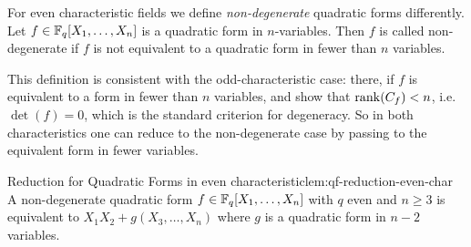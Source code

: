 For even characteristic fields we define \emph{non-degenerate} quadratic forms differently. Let $f\in\mathbb{F}_q[X_1,\dots,X_n]$ is a quadratic form in $n$-variables. Then $f$ is called non-degenerate if $f$ is not equivalent to a quadratic form in fewer than $n$ variables.
\begin{note}
  This definition is consistent with the odd-characteristic case: there, if $f$ is equivalent to a form in fewer than $n$ variables, \QFDiagthm and \QFDiagRankDetObs show that $\operatorname{rank}(C_f)<n$, i.e.\ $\det(f)=0$, which is the standard criterion for degeneracy. So in both characteristics one can reduce to the non-degenerate case by passing to the equivalent form in fewer variables.
\end{note}  
\begin{lemma}{Reduction for Quadratic Forms in even characteristic}{lem:qf-reduction-even-char}
  A non-degenerate quadratic form $f\in\mathbb{F}_q[X_1,\dots,X_n]$ with $q$ even and $n\geq 3$ is equivalent to $X_1X_2+g(X_3,\dots, X_n)$ where $g$ is a quadratic form in $n-2$ variables.
\end{lemma}
